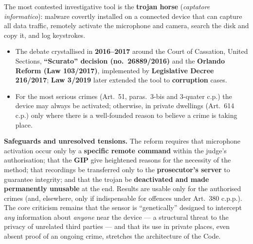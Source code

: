 \documentclass[11pt,a4paper,openany]{report}
\theoremstyle{definition}
\theoremstyle{plain}
\theoremstyle{remark}
\begin{document}
The most contested investigative tool is the \textbf{trojan horse} (\emph{captatore informatico}): malware covertly installed on a connected device that can capture all data traffic, remotely activate the microphone and camera, search the disk and copy it, and log keystrokes.

\begin{itemize}
    \item The debate crystallised in \textbf{2016--2017} around the Court of Cassation, United Sections, \textbf{``Scurato'' decision (no.\ 26889/2016)} and the \textbf{Orlando Reform (Law 103/2017)}, implemented by \textbf{Legislative Decree 216/2017}; \textbf{Law 3/2019} later extended the tool to \textbf{corruption} cases.
    \item For the most serious crimes (Art.\ 51, paras.\ 3-bis and 3-quater c.p.) the device may always be activated; otherwise, in private dwellings (Art.\ 614 c.p.) only where there is a well-founded reason to believe a crime is taking place.
\end{itemize}

\begin{actionbox}
\textbf{Safeguards and unresolved tensions.} The reform requires that microphone activation occur only by a \textbf{specific remote command} within the judge's authorisation; that the \textbf{GIP} give heightened reasons for the necessity of the method; that recordings be transferred only to the \textbf{prosecutor's server} to guarantee integrity; and that the trojan be \textbf{deactivated and made permanently unusable} at the end. Results are usable only for the authorised crimes (and, elsewhere, only if indispensable for offences under Art.\ 380 c.p.p.). The core criticism remains that the sensor is ``genetically'' designed to intercept \emph{any} information about \emph{anyone} near the device --- a structural threat to the privacy of unrelated third parties --- and that its use in private places, even absent proof of an ongoing crime, stretches the architecture of the Code.
\end{actionbox}
\end{document}

